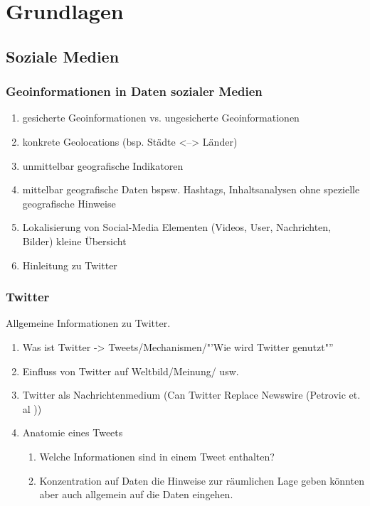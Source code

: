 \chapter{Grundlagen} 

	\section{Soziale Medien}

		\subsection{Geoinformationen in Daten sozialer Medien}
	 		\begin{enumerate}
	 			\item {} gesicherte Geoinformationen vs. ungesicherte Geoinformationen
	 			\item konkrete Geolocations (bsp. Städte <--> Länder) \cite{Hecht2011}
	 			\item unmittelbar geografische Indikatoren
				\item mittelbar geografische Daten bspsw. Hashtags, Inhaltsanalysen ohne spezielle geografische Hinweise
	 			\item Lokalisierung von Social-Media Elementen (Videos, User, Nachrichten, Bilder) kleine Übersicht
	 			\item Hinleitung zu Twitter  
	 		\end{enumerate}

		\subsection{Twitter}
			Allgemeine Informationen zu Twitter. 
			\begin{enumerate}
				\item Was ist Twitter -> Tweets/Mechanismen/"'Wie wird Twitter genutzt"''
				\item {} Einfluss von Twitter auf Weltbild/Meinung/ usw.
				\item Twitter als Nachrichtenmedium (Can Twitter Replace Newswire (Petrovic et. al ))
				\item Anatomie eines Tweets 
					\begin{enumerate}
						\item Welche Informationen sind in einem Tweet enthalten? 
						\item Konzentration auf Daten die Hinweise zur räumlichen Lage geben könnten aber auch allgemein auf die Daten eingehen.
					\end{enumerate}
			\end{enumerate} 


